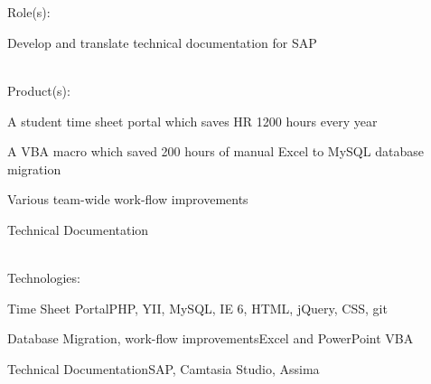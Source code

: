 \documentclass[letterpaper]{deedy-resume} %
\begin{document}
\sectionspace %
\\[\fpeval{\baseheight*\golden}]


\\[\fpeval{\baseheight*\golden}]

Role(s):

\begin{tightitemize}
    \item Develop and translate technical documentation for SAP
\end{tightitemize}

\\[\fpeval{\baseheight*\golden}]

Product(s):
\begin{tightitemize}
    \item A student time sheet portal which saves HR 1200 hours every year
    \item A VBA macro which saved 200 hours of manual Excel to MySQL database migration
    \item Various team-wide work-flow improvements
    \item Technical Documentation
\end{tightitemize}

\\[\fpeval{\baseheight*\golden}]

Technologies: \\
\begin{tightitemize}
    \item Time Sheet Portal\textemdash PHP, YII, MySQL, IE 6, HTML, jQuery, CSS, git
    \item Database Migration, work-flow improvements\textemdash Excel and PowerPoint VBA
    \item Technical Documentation\textemdash SAP, Camtasia Studio, Assima
\end{tightitemize}

\sectionspace %



\newpage %

\end{document}
